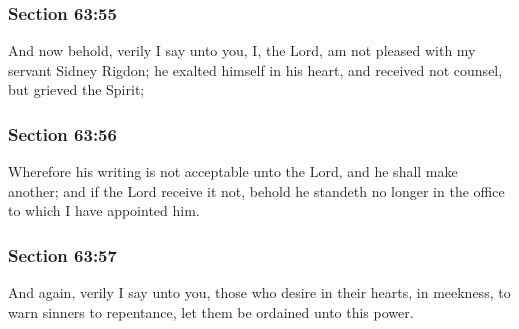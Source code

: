 	\subsubsection{Section 63:55} %
		\label{DC63-55}

		And now behold, verily I say unto you, I, the Lord, am not pleased with my servant Sidney Rigdon; he exalted himself in his heart, and received not counsel, but grieved the Spirit;


	\subsubsection{Section 63:56} %
		\label{DC63-56}

		Wherefore his writing is not acceptable unto the Lord, and he shall make another; and if the Lord receive it not, behold he standeth no longer in the office to which I have appointed him.


	\subsubsection{Section 63:57} %
		\label{DC63-57}

		And again, verily I say unto you, those who desire in their hearts, in meekness, to warn sinners to repentance, let them be ordained unto this power.


